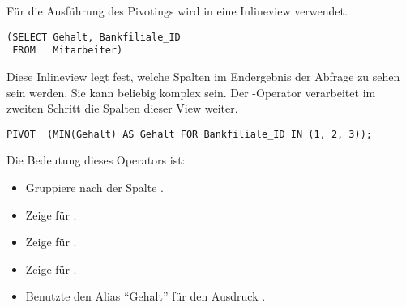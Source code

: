           F\"ur die Ausf\"uhrung des Pivotings wird in  eine Inlineview verwendet.
          \begin{lstlisting}[language=oracle_sql,caption={Die Inlineview},label=sql06_18]
(SELECT Gehalt, Bankfiliale_ID
 FROM   Mitarbeiter)
          \end{lstlisting}
          Diese Inlineview legt fest, welche Spalten im Endergebnis der Abfrage zu sehen sein werden. Sie kann beliebig komplex sein. Der -Operator verarbeitet im zweiten Schritt die Spalten dieser View weiter.
          \begin{lstlisting}[language=oracle_sql,caption={Der \languageorasql{PIVOT}-Operator},label=sql06_19]
PIVOT  (MIN(Gehalt) AS Gehalt FOR Bankfiliale_ID IN (1, 2, 3));
          \end{lstlisting}
          Die Bedeutung dieses Operators ist:
          \begin{itemize}
            \item Gruppiere nach der Spalte .
            \item Zeige  f\"ur .
            \item Zeige  f\"ur .
            \item Zeige  f\"ur .
            \item Benutzte den Alias \enquote{Gehalt} f\"ur den Ausdruck .
          \end{itemize}
